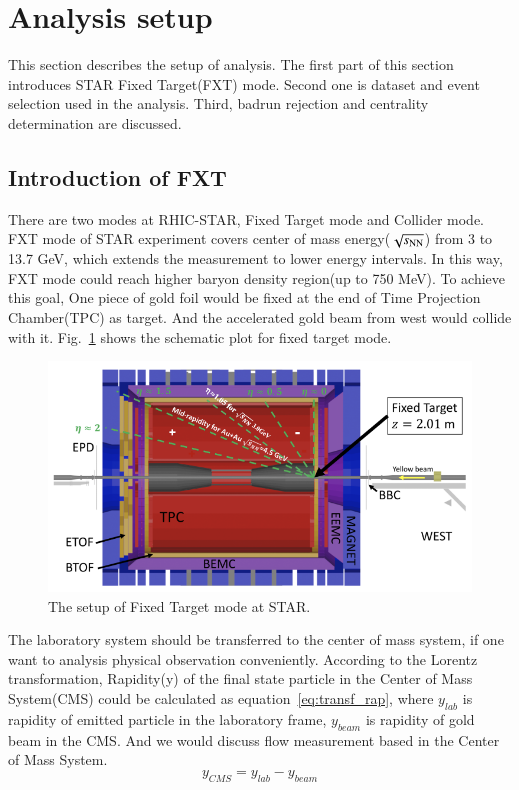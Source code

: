 
\section{Analysis setup}

This section describes the setup of analysis. 
The first part of this section introduces STAR Fixed Target(FXT) mode. 
Second one is dataset and event selection used in the analysis. 
Third, badrun rejection and centrality determination are discussed.

\subsection{Introduction of FXT}

There are two modes at RHIC-STAR, Fixed Target mode and Collider mode. 
FXT mode of STAR experiment covers center of mass energy($\sqrt{s_\text{NN}}$) from 3 to 13.7 GeV, which extends the measurement to lower energy intervals.
In this way, FXT mode could reach higher baryon density region(up to 750 MeV). 
To achieve this goal, One piece of gold foil would be fixed at the end of Time Projection Chamber(TPC) as target.
And the accelerated gold beam from west would collide with it. Fig.~\ref{fig:FXTmode} shows the schematic plot for fixed target mode.
\begin{figure}[hbt!]
\centering
\includegraphics[width=0.85\linewidth]{figures/chapter01/FXTmode.png}
\caption{The setup of Fixed Target mode at STAR.}
\label{fig:FXTmode}
\end{figure}

The laboratory system should be transferred to the center of mass system, 
if one want to analysis physical observation conveniently. 
According to the Lorentz transformation, Rapidity(y) of the final state particle in the Center of Mass System(CMS) could be calculated as equation~\ref{eq:transf_rap}, 
where $y_{lab}$ is rapidity of emitted particle in the laboratory frame, $y_{beam}$ is rapidity of gold beam in the CMS.
And we would discuss flow measurement based in the Center of Mass System.
\begin{equation}
    y_{CMS} = y_{lab} - y_{beam}
\label{eq:transf_rap}
\end{equation}

